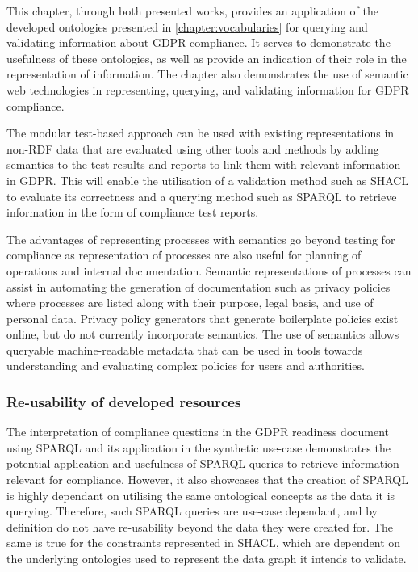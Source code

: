 This chapter, through both presented works, provides an application of the developed ontologies presented in \autoref{chapter:vocabularies} for querying and validating information about GDPR compliance.
It serves to demonstrate the usefulness of these ontologies, as well as provide an indication of their role in the representation of information.
The chapter also demonstrates the use of semantic web technologies in representing, querying, and validating information for GDPR compliance.

The modular test-based approach can be used with existing representations in non-RDF data that are evaluated using other tools and methods by adding semantics to the test results and reports to link them with relevant information in GDPR. This will enable the utilisation of a validation method such as SHACL to evaluate its correctness and a querying method such as SPARQL to retrieve information in the form of compliance test reports. 

The advantages of representing processes with semantics go beyond testing for compliance as representation of processes are also useful for planning of operations and internal documentation. Semantic representations of processes can assist in automating the generation of documentation such as privacy policies where processes are listed along with their purpose, legal basis, and use of personal data. Privacy policy generators that generate boilerplate policies exist online, but do not currently incorporate semantics. The use of semantics allows queryable machine-readable metadata that can be used in tools towards understanding and evaluating complex policies for users and authorities.

\subsubsection{Re-usability of developed resources}
The interpretation of compliance questions in the GDPR readiness document using SPARQL and its application in the synthetic use-case demonstrates the potential application and usefulness of SPARQL queries to retrieve information relevant for compliance.
However, it also showcases that the creation of SPARQL is highly dependant on utilising the same ontological concepts as the data it is querying. Therefore, such SPARQL queries are use-case dependant, and by definition do not have re-usability beyond the data they were created for.
The same is true for the constraints represented in SHACL, which are dependent on the underlying ontologies used to represent the data graph it intends to validate.

